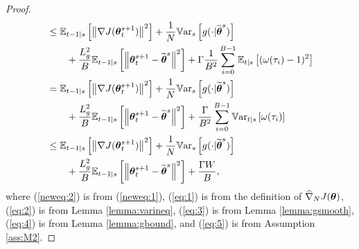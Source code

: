 \begin{proof}
\begin{align}
	&\leq \Ets[t-1]{\norm[]{\gradJ{\vtheta_t^{s+1}}}^2} 
	+\frac{1}{N}\Vars{g(\cdot\vert\wt{\vtheta}^s)}
	\nonumber\\
	&\qquad+\frac{L_g^2}{B}\Ets[t-1]{\norm[]{\vtheta_t^{s+1}-\wt{\vtheta}^s}^2}
	+\Gamma\frac{1}{B^2}\sum_{i=0}^{B-1}\Ets{(\omega(\tau_i)-1)^2} \label{eq:4}\\
	&= \Ets[t-1]{\norm[]{\gradJ{\vtheta_t^{s+1}}}^2} 
	+\frac{1}{N}\Vars{g(\cdot\vert\wt{\vtheta}^s)}
	\nonumber\\&\qquad
	+\frac{L_g^2}{B}\Ets[t-1]{\norm[]{\vtheta_t^{s+1}-\wt{\vtheta}^s}^2}
	+\frac{\Gamma}{B^2}\sum_{i=0}^{B-1}\Varts{\omega(\tau_i)} \nonumber\\
	&\leq \Ets[t-1]{\norm[]{\gradJ{\vtheta_t^{s+1}}}^2} 
	+\frac{1}{N}\Vars{g(\cdot\vert\wt{\vtheta}^s)}
	\nonumber\\ &\qquad
	+\frac{L_g^2}{B}\Ets[t-1]{\norm[]{\vtheta_t^{s+1}-\wt{\vtheta}^s}^2}
	+\frac{\Gamma\VARIS}{B}, \label{eq:5}
	\end{align}
	\endgroup
	where (\ref{neweq:2}) is from (\ref{neweq:1}), (\ref{eq:1}) is from the definition of $\gradApp{\vtheta}{N}$, (\ref{eq:2}) is from Lemma \ref{lemma:varineq}, (\ref{eq:3}) is from Lemma \ref{lemma:gsmooth}, 
	(\ref{eq:4}) is from Lemma \ref{lemma:gbound}, and (\ref{eq:5}) is from Assumption \ref{ass:M2}.
\end{proof}

